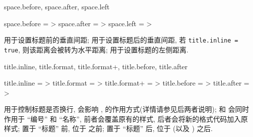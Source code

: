 \begin{keyval}{space.before, space.after, space.left}
  \begin{syntax}
    space.before =  > 
    space.after  =  > 
    space.left   =  > 
  \end{syntax}
   用于设置标题前的垂直间距;  用于设置标题后的垂直间距,
  若 \texttt{title.inline = true}, 则该距离会被转为水平距离;  用于设置标题的左侧距离.
\end{keyval}



\begin{keyval}{title.inline, title.format, title.format+, title.before, title.after}
  \begin{syntax}
    title.inline  =  > 
    title.format  =  > 
    title.format+ =  > 
    title.before  =  > 
    title.after   =  > 
  \end{syntax}
   用于控制标题是否换行, 会影响 ,  
  的作用方式(详情请参见后两者说明);  和  会同时作用于
  ``编号'' 和 ``名称'', 前者会覆盖原有的样式, 后者会将新的格式代码加入原样式; 
  置于 ``标题'' 前, 位于  之前;  置于 ``标题'' 后, 位于 
  (以及 ) 之后.
\end{keyval}


